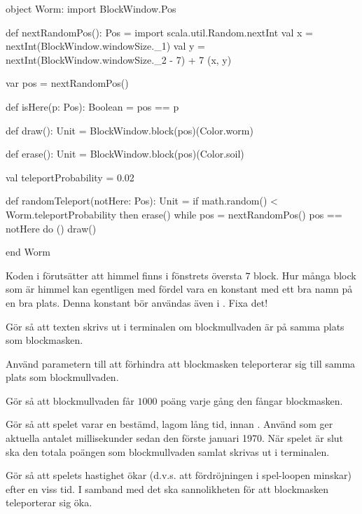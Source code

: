 \begin{Code}
object Worm:
  import BlockWindow.Pos

  def nextRandomPos(): Pos = 
    import scala.util.Random.nextInt
    val x = nextInt(BlockWindow.windowSize._1)
    val y = nextInt(BlockWindow.windowSize._2 - 7) + 7
    (x, y)

  var pos = nextRandomPos()

  def isHere(p: Pos): Boolean = pos == p

  def draw(): Unit  = BlockWindow.block(pos)(Color.worm)

  def erase(): Unit = BlockWindow.block(pos)(Color.soil)

  val teleportProbability = 0.02

  def randomTeleport(notHere: Pos): Unit =
    if math.random() < Worm.teleportProbability then
      erase()
      while
        pos = nextRandomPos()
        pos == notHere
      do ()
      draw()
    
end Worm
\end{Code}

\Subtask Koden i  förutsätter att himmel finns i fönstrets översta $7$ block. Hur många block som är himmel kan egentligen med fördel vara en konstant med ett bra namn på en bra plats. Denna konstant bör användas även i . Fixa det!

\Subtask Gör så att texten  skrivs ut i terminalen om blockmullvaden är på samma plats som blockmasken.

\Subtask Använd parametern  till att förhindra att blockmasken teleporterar sig till samma plats som blockmullvaden.

\Subtask Gör så att blockmullvaden får $1000$ poäng varje gång den fångar blockmasken.

\Subtask Gör så att spelet varar en bestämd, lagom lång tid, innan . Använd  som ger aktuella antalet millisekunder sedan den förste januari 1970. När spelet är slut ska den totala poängen som blockmullvaden samlat skrivas ut i terminalen.

\Subtask Gör så att spelets hastighet ökar (d.v.s. att fördröjningen i spel-loopen minskar) efter en viss tid. I samband med det ska sannolikheten för att blockmasken teleporterar sig öka.
